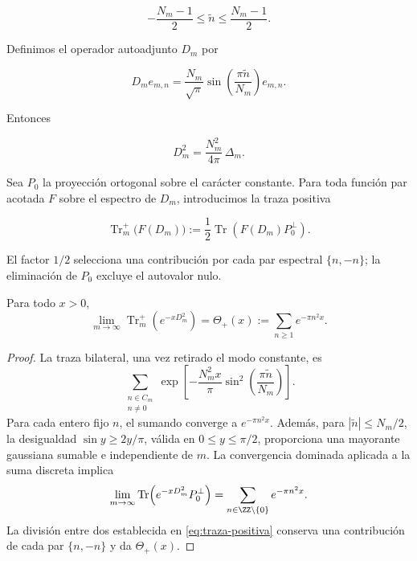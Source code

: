 \[
 -\frac{N_m-1}{2}\leq\widetilde n\leq\frac{N_m-1}{2}.
\]

Definimos el operador autoadjunto $D_m$ por

\begin{equation}
 D_m e_{m,n}
 =\frac{N_m}{\sqrt\pi}
 \sin\!\left(\frac{\pi\widetilde n}{N_m}\right)e_{m,n}.
 \label{eq:operador-espectral-Dm}
\end{equation}

Entonces

\begin{equation}
 D_m^2=\frac{N_m^2}{4\pi}\,\Delta_m.
 \label{eq:Dm-laplaciano}
\end{equation}

Sea $P_0$ la proyección ortogonal sobre el carácter constante. Para toda
función par acotada $F$ sobre el espectro de $D_m$, introducimos la traza
positiva

\begin{equation}
 \operatorname{Tr}^{+}_m\!\bigl(F(D_m)\bigr)
 :=\frac12\operatorname{Tr}
 \!\left(F(D_m)P_0^{\perp}\right).
 \label{eq:traza-positiva}
\end{equation}

El factor $1/2$ selecciona una contribución por cada par espectral
$\{n,-n\}$; la eliminación de $P_0$ excluye el autovalor nulo.

\begin{theorem}
\label{thm:limite-theta-triadico}
Para todo $x>0$,
\[
 \lim_{m\to\infty}
 \operatorname{Tr}^{+}_m\!\left(e^{-xD_m^2}\right)
 =\Theta_+(x)
 :=\sum_{n\geq1}e^{-\pi n^2x}.
\]
\end{theorem}

\begin{proof}
La traza bilateral, una vez retirado el modo constante, es
\[
 \sum_{\substack{n\in C_m\\n\neq0}}
 \exp\!\left[
 -\frac{N_m^2x}{\pi}
 \sin^2\!\left(\frac{\pi\widetilde n}{N_m}\right)
 \right].
\]
Para cada entero fijo $n$, el sumando converge a $e^{-\pi n^2x}$. Además,
para $|\widetilde n|\leq N_m/2$, la desigualdad
$\sin y\geq 2y/\pi$, válida en $0\leq y\leq\pi/2$, proporciona una
mayorante gaussiana sumable e independiente de $m$. La convergencia
dominada aplicada a la suma discreta implica
\[
 \lim_{m\to\infty}
 \operatorname{Tr}\!\left(e^{-xD_m^2}P_0^\perp\right)
 =\sum_{n\in\ZZ\setminus\{0\}}e^{-\pi n^2x}.
\]
La división entre dos establecida en \eqref{eq:traza-positiva} conserva una
contribución de cada par $\{n,-n\}$ y da $\Theta_+(x)$.
\end{proof}


